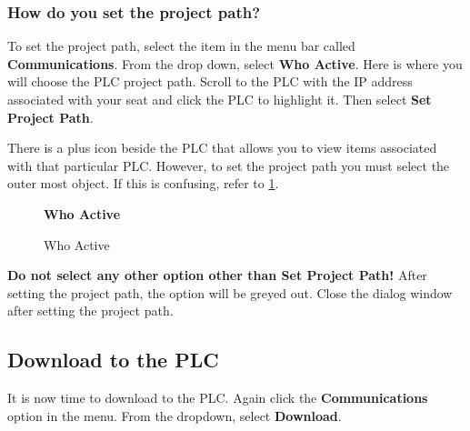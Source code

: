\subsubsection{How do you set the project path?}

To set the project path, select the item in the menu bar called \textbf{Communications}. From the drop down, select \textbf{Who Active}. Here is where you will choose the PLC project path. Scroll to the PLC with the IP address associated with your seat and click the PLC to highlight it. Then select \textbf{Set Project Path}. 


There is a plus icon beside the PLC that allows you to view items associated with that particular PLC. However, to set the project path you must select the outer most object. If this is confusing, refer to \figureautorefname \ref{fig:WhoActive}.


\begin{figure}[h]
\centering
\textbf{Who Active}\par \medskip
{}
\caption{Who Active}
\label{fig:WhoActive}
\end{figure}



\textbf{Do not select any other option other than Set Project Path!} After setting the project path, the option will be greyed out. Close the dialog window after setting the project path.

\subsection{Download to the PLC}
\label{subsection:DownloadPLC}

It is now time to download to the PLC. Again click the \textbf{Communications} option in the menu. From the dropdown, select \textbf{Download}. 


